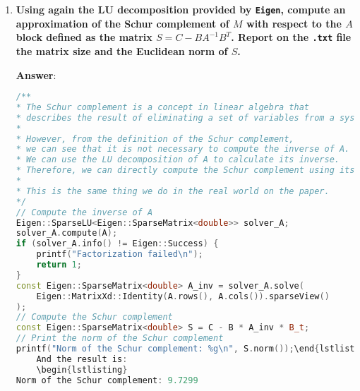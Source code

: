 \begin{enumerate}[label=\textcolor{Green3}{\textbf{\arabic*.}}]
    \textbf{Answer}:
    \begin{lstlisting}[language=C++]
// Define vector b
const Eigen::VectorXd b = Eigen::VectorXd::Ones(M.rows());
// Solve the system Mx = b using the LU decomposition
Eigen::SparseLU<Eigen::SparseMatrix<double>> solver;
solver.compute(M.sparseView());
if (solver.info() != Eigen::Success) {
    printf("Factorization failed\n");
    return 1;
}
const Eigen::VectorXd x = solver.solve(b);
// Print the norm of the absolute residual
// We compute the absolute residual by subtracting the product of M and x from b.
// In fact, the residual is the difference between the right-hand side
// and the left-hand side of the equation.
// If the residual is (approximately) zero, the solution is correct.
printf("Norm of the absolute residual: %g\n", (M*x - b).norm());\end{lstlisting}
    And the result is:
    \begin{lstlisting}
Norm of the absolute residual: 1.62043e-13\end{lstlisting}


    \newpage

    \item \textcolor{Green3}{\textbf{%
        Using again the LU decomposition provided by \texttt{Eigen}, compute an approximation of the Schur complement of $M$ with respect to the $A$ block defined as the matrix $S = C- B A^{-1}B^{T}$. Report on the \texttt{.txt} file the matrix size and the Euclidean norm of $S$.
    }}

    \textbf{Answer}:
    \begin{lstlisting}[language=C++]
/**
* The Schur complement is a concept in linear algebra that
* describes the result of eliminating a set of variables from a system of linear equations.
*
* However, from the definition of the Schur complement,
* we can see that it is not necessary to compute the inverse of A.
* We can use the LU decomposition of A to calculate its inverse.
* Therefore, we can directly compute the Schur complement using its definition.
*
* This is the same thing we do in the real world on the paper.
*/
// Compute the inverse of A
Eigen::SparseLU<Eigen::SparseMatrix<double>> solver_A;
solver_A.compute(A);
if (solver_A.info() != Eigen::Success) {
    printf("Factorization failed\n");
    return 1;
}
const Eigen::SparseMatrix<double> A_inv = solver_A.solve(
    Eigen::MatrixXd::Identity(A.rows(), A.cols()).sparseView()
);
// Compute the Schur complement
const Eigen::SparseMatrix<double> S = C - B * A_inv * B_t;
// Print the norm of the Schur complement
printf("Norm of the Schur complement: %g\n", S.norm());\end{lstlisting}
    And the result is:
    \begin{lstlisting}
Norm of the Schur complement: 9.7299\end{lstlisting}



\end{enumerate}
